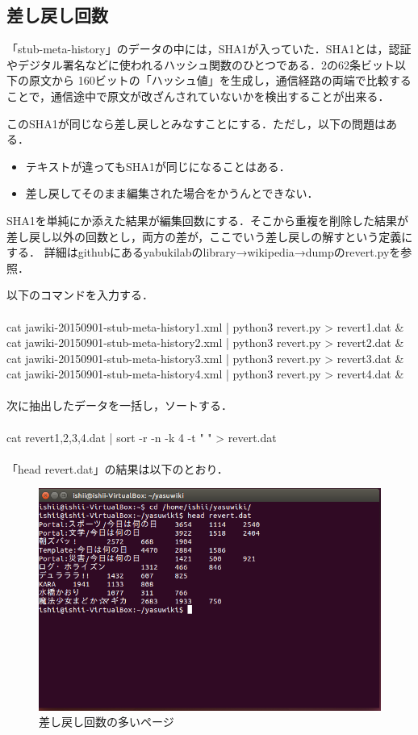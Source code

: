 \subsection{差し戻し回数}

「stub-meta-history」のデータの中には，SHA1が入っていた．SHA1とは，認証やデジタル署名などに使われるハッシュ関数のひとつである．2の62条ビット以下の原文から
160ビットの「ハッシュ値」を生成し，通信経路の両端で比較することで，通信途中で原文が改ざんされていないかを検出することが出来る．

このSHA1が同じなら差し戻しとみなすことにする．ただし，以下の問題はある．
\begin{itemize}
 \item テキストが違ってもSHA1が同じになることはある．
 \item 差し戻してそのまま編集された場合をかうんとできない．
\end{itemize}

SHA1を単純にか添えた結果が編集回数にする．そこから重複を削除した結果が差し戻し以外の回数とし，両方の差が，ここでいう差し戻しの解すという定義にする．
詳細はgithubにあるyabukilabのlibrary→wikipedia→dumpのrevert.pyを参照．

以下のコマンドを入力する．\\
\\
cat jawiki-20150901-stub-meta-history1.xml | python3 revert.py > revert1.dat \& \\
cat jawiki-20150901-stub-meta-history2.xml | python3 revert.py > revert2.dat \& \\
cat jawiki-20150901-stub-meta-history3.xml | python3 revert.py > revert3.dat \& \\
cat jawiki-20150901-stub-meta-history4.xml | python3 revert.py > revert4.dat \& \\
\\
次に抽出したデータを一括し，ソートする．\\
\\
cat revert{1,2,3,4}.dat | sort -r -n -k 4 -t "  " > revert.dat \\
\\
「head revert.dat」の結果は以下のとおり．

\begin{figure}[H]
\centering
\includegraphics[width=14cm]{head_revert.png}
\caption{差し戻し回数の多いページ}\label{サンプル図}
\end{figure}


